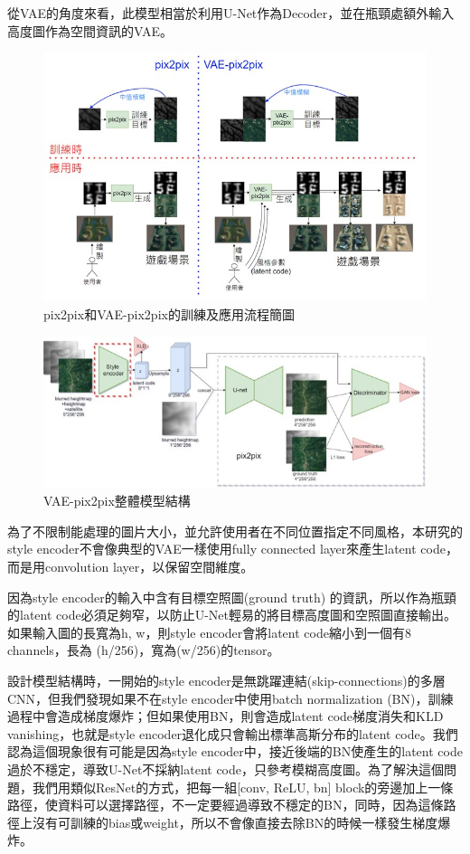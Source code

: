 \documentclass[a4paper, 12pt]{article}
\begin{document}
從VAE的角度來看，此模型相當於利用U-Net作為Decoder，並在瓶頸處額外輸入高度圖作為空間資訊的VAE。

\begin{figure}[H]
    \centering
    \includegraphics[width=\linewidth]{fig/6.jpg}
    \caption{pix2pix和VAE-pix2pix的訓練及應用流程簡圖}
    \label{fig:6}
\end{figure}

\begin{figure}[H]
    \centering
    \includegraphics[width=\linewidth]{fig/7.jpg}
    \caption{VAE-pix2pix整體模型結構}
    \label{fig:7}
\end{figure}


為了不限制能處理的圖片大小，並允許使用者在不同位置指定不同風格，本研究的style encoder不會像典型的VAE一樣使用fully connected layer來產生latent code，而是用convolution layer，以保留空間維度。

因為style encoder的輸入中含有目標空照圖(ground truth) 的資訊，所以作為瓶頸的latent code必須足夠窄，以防止U-Net輕易的將目標高度圖和空照圖直接輸出。如果輸入圖的長寬為h, w，則style encoder會將latent code縮小到一個有8 channels，長為 (h/256)，寬為(w/256)的tensor。

設計模型結構時，一開始的style encoder是無跳躍連結(skip-connections)的多層CNN，但我們發現如果不在style encoder中使用batch normalization (BN)，訓練過程中會造成梯度爆炸；但如果使用BN，則會造成latent code梯度消失和KLD vanishing，也就是style encoder退化成只會輸出標準高斯分布的latent code。我們認為這個現象很有可能是因為style encoder中，接近後端的BN使產生的latent code過於不穩定，導致U-Net不採納latent code，只參考模糊高度圖。為了解決這個問題，我們用類似ResNet的方式，把每一組[conv, ReLU, bn] block的旁邊加上一條路徑，使資料可以選擇路徑，不一定要經過導致不穩定的BN，同時，因為這條路徑上沒有可訓練的bias或weight，所以不會像直接去除BN的時候一樣發生梯度爆炸。
\end{document}
